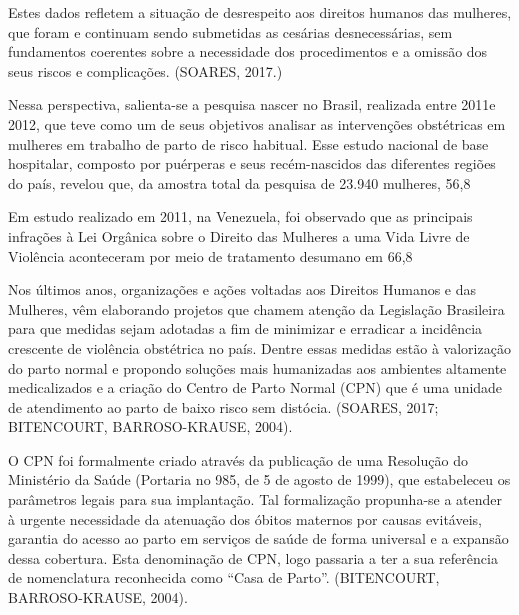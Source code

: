 Estes dados refletem a situação de desrespeito aos direitos humanos das mulheres, que foram e continuam sendo submetidas as cesárias desnecessárias, sem fundamentos coerentes sobre a necessidade dos procedimentos e a omissão dos seus riscos e complicações. (SOARES, 2017.)

Nessa perspectiva, salienta-se a pesquisa nascer no Brasil, realizada entre 2011e 2012, que teve como um de seus objetivos analisar as intervenções obstétricas em mulheres em trabalho de parto de risco habitual. Esse estudo nacional de base hospitalar, composto por puérperas e seus recém-nascidos das diferentes regiões do país, revelou que, da amostra total da pesquisa de 23.940 mulheres, 56,8%

Em estudo realizado em 2011, na Venezuela, foi observado que as principais infrações à Lei Orgânica sobre o Direito das Mulheres a uma Vida Livre de Violência aconteceram por meio de tratamento desumano em 66,8%

Nos últimos anos, organizações e ações voltadas aos Direitos Humanos e das Mulheres, vêm elaborando projetos que chamem atenção da Legislação Brasileira para que medidas sejam adotadas a fim de minimizar e erradicar a incidência crescente de violência obstétrica no país. Dentre essas medidas estão à valorização do parto normal e propondo soluções mais humanizadas aos ambientes altamente medicalizados e a criação do Centro de Parto Normal (CPN) que é uma unidade de atendimento ao parto de baixo risco sem distócia. (SOARES, 2017; BITENCOURT, BARROSO-KRAUSE, 2004).

O CPN foi formalmente criado através da publicação de uma Resolução do Ministério da Saúde (Portaria no 985, de 5 de agosto de 1999), que estabeleceu os parâmetros legais para sua implantação. Tal formalização propunha-se a atender à urgente necessidade da atenuação dos óbitos maternos por causas evitáveis, garantia do acesso ao parto em serviços de saúde de forma universal e a expansão dessa cobertura. Esta denominação de CPN, logo passaria a ter a sua referência de nomenclatura reconhecida como “Casa de Parto”.  (BITENCOURT, BARROSO-KRAUSE, 2004).

